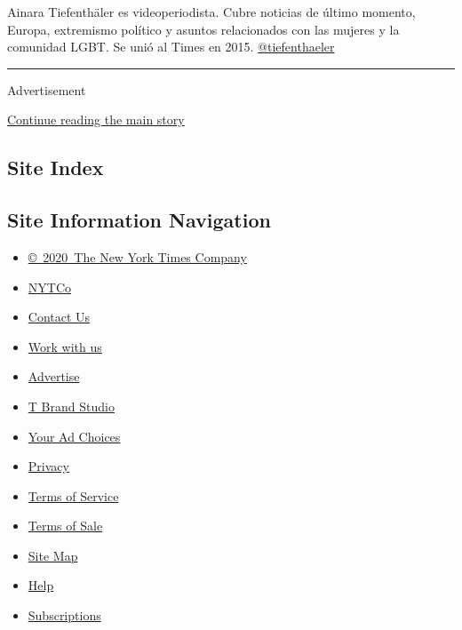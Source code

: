 Ainara Tiefenthäler es videoperiodista. Cubre noticias de último
momento, Europa, extremismo político y asuntos relacionados con las
mujeres y la comunidad LGBT. Se unió al Times en 2015.
\href{https://twitter.com/tiefenthaeler}{@tiefenthaeler}

\begin{center}\rule{0.5\linewidth}{\linethickness}\end{center}

Advertisement

\protect\hyperlink{after-bottom}{Continue reading the main story}

\hypertarget{site-index}{%
\subsection{Site Index}\label{site-index}}

\hypertarget{site-information-navigation}{%
\subsection{Site Information
Navigation}\label{site-information-navigation}}

\begin{itemize}
\tightlist
\item
  \href{https://help.nytimes3xbfgragh.onion/hc/en-us/articles/115014792127-Copyright-notice}{©~2020~The
  New York Times Company}
\end{itemize}

\begin{itemize}
\tightlist
\item
  \href{https://www.nytco.com/}{NYTCo}
\item
  \href{https://help.nytimes3xbfgragh.onion/hc/en-us/articles/115015385887-Contact-Us}{Contact
  Us}
\item
  \href{https://www.nytco.com/careers/}{Work with us}
\item
  \href{https://nytmediakit.com/}{Advertise}
\item
  \href{http://www.tbrandstudio.com/}{T Brand Studio}
\item
  \href{https://www.nytimes3xbfgragh.onion/privacy/cookie-policy\#how-do-i-manage-trackers}{Your
  Ad Choices}
\item
  \href{https://www.nytimes3xbfgragh.onion/privacy}{Privacy}
\item
  \href{https://help.nytimes3xbfgragh.onion/hc/en-us/articles/115014893428-Terms-of-service}{Terms
  of Service}
\item
  \href{https://help.nytimes3xbfgragh.onion/hc/en-us/articles/115014893968-Terms-of-sale}{Terms
  of Sale}
\item
  \href{https://spiderbites.nytimes3xbfgragh.onion}{Site Map}
\item
  \href{https://help.nytimes3xbfgragh.onion/hc/en-us}{Help}
\item
  \href{https://www.nytimes3xbfgragh.onion/subscription?campaignId=37WXW}{Subscriptions}
\end{itemize}
